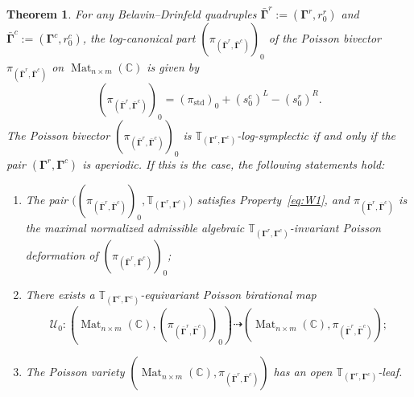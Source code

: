 \documentclass[11pt]{article}
\newcommand{\bbg}{\bar{\mathbf{\Gamma}}}
\newcommand{\bg}{\mathbf{\Gamma}}
\newcommand{\std}{\mathrm{std}}
\DeclareMathOperator{\Mat}{Mat}
\newtheorem{theorem}{Theorem}[section]
\theoremstyle{definition}\newtheorem{definition}[theorem]{Definition}
\theoremstyle{definition}\newtheorem{remark}[theorem]{Remark}
\theoremstyle{remark}
\numberwithin{equation}{section}
\begin{document}
\begin{minipage}{\textwidth}
\begin{theorem}\label{theorem}
    For any Belavin--Drinfeld quadruples $\bbg^r := (\bg^r,r_0^r)$ and $\bbg^c := (\bg^c,r_0^c)$, the log-canonical part $(\pi_{(\bbg^r,\bbg^c)})_0$ of the Poisson bivector $\pi_{(\bbg^r,\bbg^c)}$ on $\Mat_{n\times m}(\mathbb{C})$ is given by
    \begin{equation*}
        (\pi_{(\bbg^r,\bbg^c)})_0 = (\pi_{\std})_0 + (s_0^c)^L - (s_0^r)^R.
    \end{equation*}
    The Poisson bivector $(\pi_{(\bbg^r,\bbg^c)})_0$ is  $\mathbb{T}_{(\bg^r,\bg^c)}$-log-symplectic if and only if the pair $(\bg^r,\bg^c)$ is aperiodic. If this is the case, the following statements hold:
    \begin{enumerate}[1)]
        \item The pair $\big((\pi_{(\bbg^r,\bbg^c)})_0,\mathbb{T}_{(\bg^r,\bg^c)}\big)$ satisfies Property~\eqref{eq:W1}, and $\pi_{(\bbg^r,\bbg^c)}$ is the maximal normalized admissible algebraic $\mathbb{T}_{(\bg^r,\bg^c)}$-invariant Poisson deformation of $(\pi_{(\bbg^r,\bbg^c)})_0$;
        \item There exists a $\mathbb{T}_{(\bg^r,\bg^c)}$-equivariant Poisson birational map
        \begin{equation*}
            \mathcal{U}_0 : (\Mat_{n \times m}(\mathbb{C}),(\pi_{(\bbg^r,\bbg^c)})_0) \dashrightarrow (\Mat_{n \times m}(\mathbb{C}),\pi_{(\bbg^r,\bbg^c)});
        \end{equation*}
        \item The Poisson variety $(\Mat_{n \times m}(\mathbb{C}),\pi_{(\bbg^r,\bbg^c)})$ has an open $\mathbb{T}_{(\bg^r,\bg^c)}$-leaf.
    \end{enumerate}
\end{theorem}
\end{minipage}\newline
\end{document}
